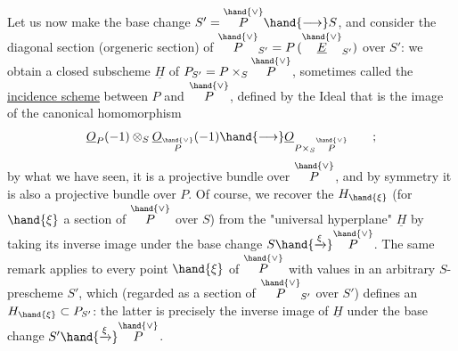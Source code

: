 
Let us now make the base change $S'=\overset{\hand{\vee}}{P}\hand{\longrightarrow} S$, and consider
the diagonal section (orgeneric section) of $\overset{\hand{\vee}}{P}_{S'} = P\,(\overset{\hand{\vee}}{\underline{E}}_{S'})$ over $S'$:
we obtain a closed subscheme $\underline{H}$ of $P_{S'} = P\times_S\overset{\hand{\vee}}{P}$, sometimes called the
\uline{incidence scheme} between $P$ and $\overset{\hand{\vee}}{P}$, defined by the Ideal that is the image of
the canonical homomorphism
\[ \underline{O}_P(-1)\otimes_S\underline{O}_{\overset{\hand{\vee}}{P}}(-1)\hand{\longrightarrow} \underline{O}_{P\times_S\overset{\hand{\vee}}{P}} \qquad ; \]
by what we have seen, it is a projective bundle over $\overset{\hand{\vee}}{P}$, and by
symmetry it is also a projective bundle over $P$. Of course, we
recover the  $H_{\hand{\xi}}$ (for $\hand{\xi}$ a section of $\overset{\hand{\vee}}{P}$ over $S$)\hand{,} from
the "universal hyperplane" $\underline{H}$\hand{,} by taking its inverse image under the base
change $S\hand{\xrightarrow{\xi}}\overset{\hand{\vee}}{P}$. The same remark applies to every point
$\hand{\xi}$ of $\overset{\hand{\vee}}{P}$ with values in an arbitrary $S$-prescheme $S'$, which (regarded as
a section of $\overset{\hand{\vee}}{P}_{S'}$ over $S'$) defines an $H_{\hand{\xi}}\subset P_{S'}$: the latter is
precisely the inverse image of $\underline{H}$ under the base change $S'\hand{\xrightarrow{\xi}}\overset{\hand{\vee}}{P}$.

